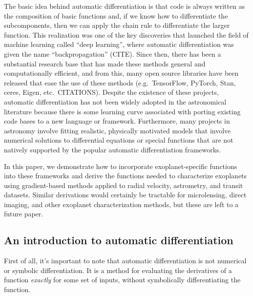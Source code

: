 \documentclass[modern]{aastex62}
\begin{document}
The basic idea behind automatic differentiation is that code is always written
as the composition of basic functions and, if we know how to differentiate the
subcomponents, then we can apply the chain rule to differentiate the larger
function.
This realization was one of the key discoveries that launched the field of
machine learning called ``deep learning'', where automatic differentiation was
given the name ``backpropagation'' (CITE).
Since then, there has been a substantial research base that has made these
methods general and computationally efficient, and from this, many open source
libraries have been released that ease the use of these methods (e.g.\
TensorFlow, PyTorch, Stan, ceres, Eigen, etc.\ CITATIONS).
Despite the existence of these projects, automatic differentiation has not
been widely adopted in the astronomical literature because there is some
learning curve associated with porting existing code bases to a new language
or framework.
Furthermore, many projects in astronomy involve fitting realistic, physically
motivated models that involve numerical solutions to differential equations
or special functions that are not natively supported by the popular automatic
differentiation frameworks.

In this paper, we demonstrate how to incorporate exoplanet-specific functions
into these frameworks and derive the functions needed to characterize
exoplanets using gradient-based methods applied to radial velocity,
astrometry, and transit datasets.
Similar derivations would certainly be tractable for microlensing, direct
imaging, and other exoplanet characterization methods, but these are left to a
future paper.

\subsection{An introduction to automatic differentiation}


First of all, it's important to note that automatic differentiation is not numerical or symbolic differentiation.
It is a method for evaluating the derivatives of a function \emph{exactly} for some set of inputs, without symbolically differentiating the function.
\end{document}
